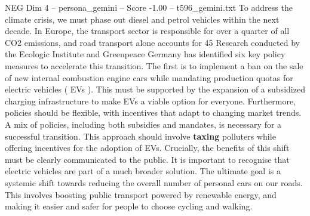 \begin{textsample}{NEG Dim 4 – persona\_gemini – Score -1.00 – t596\_gemini.txt}  \label{ex:f4_neg_005}
To address the climate crisis, we must phase out diesel and petrol vehicles within the next decade.
In Europe, the transport sector is responsible for over a quarter of all CO2 emissions, and road transport alone accounts for 45 %
Research conducted by the Ecologic Institute and Greenpeace Germany has identified six key policy measures to accelerate this transition.
The first is to implement a ban on the sale of new internal combustion engine cars while mandating production quotas for electric vehicles ( EVs ).
This must be supported by the expansion of a subsidized charging infrastructure to make EVs a viable option for everyone.
Furthermore, policies should be flexible, with incentives that adapt to changing market trends.
A mix of policies, including both subsidies and mandates, is necessary for a successful transition.
This approach should involve \textbf{taxing} polluters while offering incentives for the adoption of EVs.
Crucially, the benefits of this shift must be clearly communicated to the public.
It is important to recognise that electric vehicles are part of a much broader solution.
The ultimate goal is a systemic shift towards reducing the overall number of personal cars on our roads.
This involves boosting public transport powered by renewable energy, and making it easier and safer for people to choose cycling and walking.

\end{textsample}
